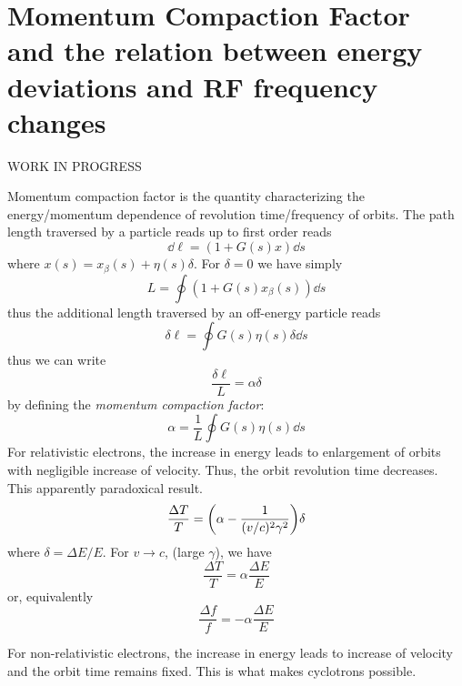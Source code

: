 \chapter{Momentum Compaction Factor and the relation between energy deviations and RF frequency changes}
WORK IN PROGRESS

Momentum compaction factor is the quantity characterizing the energy/momentum dependence of revolution time/frequency of orbits.
The path length traversed by a particle reads up to first order reads
\begin{equation}
    \dd \ell = (1 + G(s)x)\dd s
\end{equation}
where $x(s) = x_\beta(s) + \eta(s)\delta$. For $\delta = 0$ we have simply
$$L = \oint (1 + G(s)x_\beta(s))\dd{s}$$
thus the additional length traversed by an off-energy particle reads
\begin{equation}
    \delta\ell = \oint G(s)\eta(s)\delta \dd{s}
\end{equation}
thus we can write
$$\frac{\delta\ell}{L}=\alpha \delta$$
by defining the \textit{momentum compaction factor}:
\begin{equation}
    \alpha = \frac{1}{L}\oint G(s)\eta(s)\dd{s}
\end{equation}
For relativistic electrons, the increase in energy leads to enlargement of orbits with negligible increase of velocity. Thus, the orbit revolution time decreases. This apparently paradoxical result.
$$\frac{\Delta T}{T}=\qty(\alpha-\frac{1}{(v/c)^{2}\gamma^{2}})\delta$$
where $\delta = \Delta E/E$. For $v\to c$, (large $\gamma$), we have
$$\frac{\Delta T}{T}=\alpha \frac{\Delta E}{E}$$
or, equivalently
$$\frac{\Delta f}{f}=-\alpha \frac{\Delta E}{E}$$


For non-relativistic electrons, the increase in energy leads to increase of velocity and the orbit time remains fixed. This is what makes cyclotrons possible.
